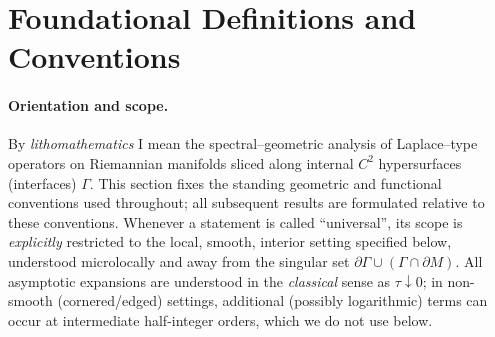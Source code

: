 

\providecommand{\vol}{\operatorname{vol}}
\providecommand{\Dom}{\operatorname{Dom}}
\providecommand{\Spec}{\operatorname{Spec}}
\providecommand{\Tr}{\operatorname{Tr}}

\section{Foundational Definitions and Conventions}\label{sec:definitions}

\paragraph{Orientation and scope.}
By \emph{lithomathematics} I mean the spectral–geometric analysis of Laplace–type operators on Riemannian manifolds sliced along internal $C^2$ hypersurfaces (interfaces) $\Gamma$.
This section fixes the standing geometric and functional conventions used throughout; all subsequent results are formulated relative to these conventions.
Whenever a statement is called “universal”, its scope is \emph{explicitly} restricted to the local, smooth, interior setting specified below, understood microlocally and away from the singular set $\partial\Gamma\cup(\Gamma\cap\partial M)$.
All asymptotic expansions are understood in the \emph{classical} sense as $\tau\downarrow 0$; in non-smooth (cornered/edged) settings, additional (possibly logarithmic) terms can occur at intermediate half-integer orders, which we do not use below.


